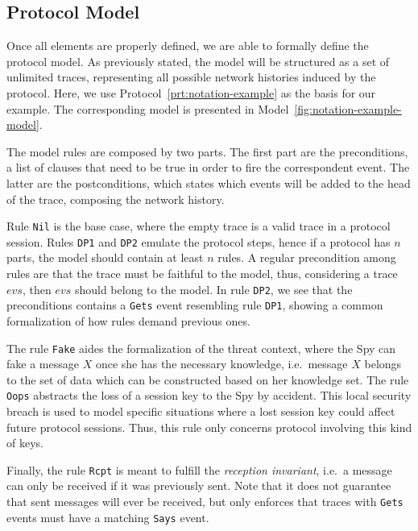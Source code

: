 \subsection{Protocol Model}
Once all elements are properly defined, we are able to formally define the protocol model. As previously stated, the model will be structured as a set of unlimited traces, representing all possible network histories induced by the protocol. Here, we use Protocol~\ref{prt:notation-example} as the basis for our example. The corresponding model is presented in Model~\ref{fig:notation-example-model}.

The model rules are composed by two parts. The first part are the preconditions, a list of clauses that need to be true in order to fire the correspondent event. The latter are the postconditions, which states which events will be added to the head of the trace, composing the network history.

Rule \texttt{Nil} is the base case, where the empty trace is a valid trace in a protocol session. Rules \texttt{DP1} and \texttt{DP2} emulate the protocol steps, hence if a protocol has \(n\) parts, the model should contain at least \(n\) rules. A regular precondition among rules are that the trace must be faithful to the model, thus, considering a trace \(evs\), then \(evs\) should belong to the model. In rule \texttt{DP2}, we see that the preconditions contains a \texttt{Gets} event resembling rule \texttt{DP1}, showing a common formalization of how rules demand previous ones.

The rule \texttt{Fake} aides the formalization of the threat context, where the Spy can fake a message \(X\) once she has the necessary knowledge, i.e.\ message \(X\) belongs to the set of data which can be constructed based on her knowledge set. The rule \texttt{Oops} abstracts the loss of a session key to the Spy by accident. This local security breach is used to model specific situations where a lost session key could affect future protocol sessions. Thus, this rule only concerns protocol involving this kind of keys.

Finally, the rule \texttt{Rcpt} is meant to fulfill the \textit{reception invariant}, i.e.\ a message can only be received if it was previously sent. Note that it does not guarantee that sent messages will ever be received, but only enforces that traces with \texttt{Gets} events must have a matching \texttt{Says} event.

